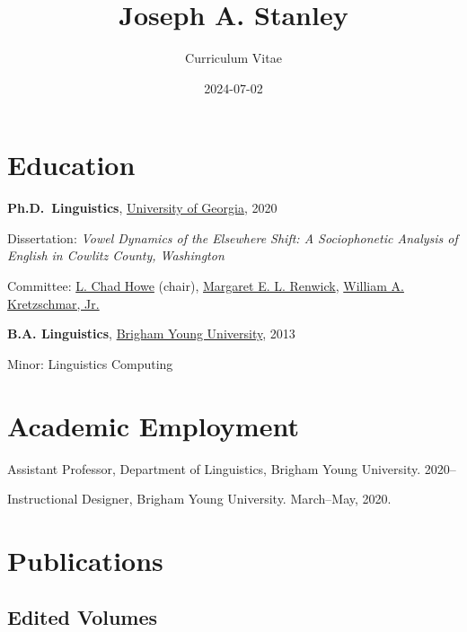 \documentclass[
]{article}
\title{Joseph A. Stanley}
\subtitle{Curriculum Vitae}
\author{}
\date{2024-07-02}
\begin{document}
\maketitle
\ifdefined\Shaded\renewenvironment{Shaded}{\begin{tcolorbox}[interior hidden, boxrule=0pt, borderline west={3pt}{0pt}{shadecolor}, breakable, frame hidden, enhanced, sharp corners]}{\end{tcolorbox}}\fi

\hypertarget{education}{%
\section{Education}\label{education}}

\textbf{Ph.D.~Linguistics},
\href{http://www.linguistics.uga.edu/}{University of Georgia}, 2020

Dissertation: \emph{Vowel Dynamics of the Elsewhere Shift: A
Sociophonetic Analysis of English in Cowlitz County, Washington}

Committee: \href{https://chadhoweuga.github.io}{L. Chad Howe} (chair),
\href{https://linguistics.uga.edu/directory/people/margaret-e-l-renwick/}{Margaret
E. L. Renwick},
\href{https://www.english.uga.edu/directory/people/william-kretzschmar}{William
A. Kretzschmar, Jr.}

\textbf{B.A. Linguistics}, \href{http://ling.byu.edu/}{Brigham Young
University}, 2013

Minor: Linguistics Computing

\hypertarget{academic-employment}{%
\section{Academic Employment}\label{academic-employment}}

Assistant Professor, Department of Linguistics, Brigham Young
University. 2020--

Instructional Designer, Brigham Young University. March--May, 2020.

\hypertarget{publications}{%
\section{Publications}\label{publications}}

\hypertarget{edited-volumes}{%
\subsection{Edited Volumes}\label{edited-volumes}}
\end{document}
